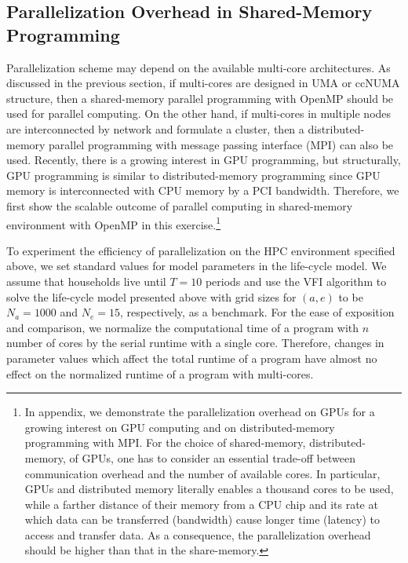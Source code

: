 \documentclass[12pt]{article}
\begin{document}
\subsection{Parallelization Overhead in Shared-Memory Programming}
Parallelization scheme may depend on the available multi-core architectures. As discussed in the previous section, if multi-cores are designed in UMA or ccNUMA structure, then a shared-memory parallel programming with OpenMP should be used for parallel computing. On the other hand, if multi-cores in multiple nodes are interconnected by network and formulate a cluster, then a distributed-memory parallel programming with message passing interface (MPI) can also be used. Recently, there is a growing interest in GPU programming, but structurally, GPU programming is similar to distributed-memory programming since GPU memory is interconnected with CPU memory by a PCI bandwidth. Therefore, we first show the scalable outcome of parallel computing in shared-memory environment with OpenMP in this exercise.\footnote{\sf In appendix, we demonstrate the parallelization overhead on GPUs for a growing interest on GPU computing and on distributed-memory programming with MPI. For the choice of shared-memory, distributed-memory, of GPUs, one has to consider an essential trade-off between communication overhead and the number of available cores. In particular, GPUs and distributed memory literally enables a thousand cores to be used, while a farther distance of their memory from a CPU chip and its rate at which data can be transferred (bandwidth) cause longer time (latency) to access and transfer data. As a consequence, the parallelization overhead should be higher than that in the share-memory.}

To experiment the efficiency of parallelization on the HPC environment specified above, we set standard values for model parameters in the life-cycle model. We assume that households live until $T=10$ periods and use the VFI algorithm to solve the life-cycle model presented above with grid sizes for $(a,e)$ to be $N_a = 1000$ and $N_e=15$, respectively, as a benchmark. For the ease of exposition and comparison, we normalize the computational time of a program with $n$ number of cores by the serial runtime with a single core. Therefore, changes in parameter values which affect the total runtime of a program have almost no effect on the normalized runtime of a program with multi-cores.
\end{document}
